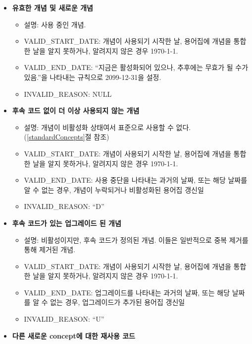 \documentclass[11pt]{book}
\providecommand{\tightlist}{%
  \setlength{\itemsep}{0pt}\setlength{\parskip}{0pt}}
\theoremstyle{definition}
\theoremstyle{definition}
\theoremstyle{definition}
\theoremstyle{remark}
\begin{document}
\begin{itemize}
\tightlist
\item
  \textbf{유효한 개념 및 새로운 개념}

  \begin{itemize}
  \tightlist
  \item
    설명: 사용 중인 개념.
  \item
    VALID\_START\_DATE: 개념이 사용되기 시작한 날, 용어집에 개념을
    통합한 날을 알지 못하거나, 알려지지 않은 경우 1970-1-1.
  \item
    VALID\_END\_DATE: ``지금은 활성화되어 있으나, 추후에는 무효가 될
    수가 있음.''을 나타내는 규칙으로 2099-12-31을 설정.
  \item
    INVALID\_REASON: NULL
  \end{itemize}
\item
  \textbf{후속 코드 없이 더 이상 사용되지 않는 개념}

  \begin{itemize}
  \tightlist
  \item
    설명: 개념이 비활성화 상태여서 표준으로 사용할 수 없다.
    (\ref{standardConcepts}절 참조)
  \item
    VALID\_START\_DATE: 개념이 사용되기 시작한 날, 용어집에 개념을
    통합한 날을 알지 못하거나, 알려지지 않은 경우 1970-1-1.
  \item
    VALID\_END\_DATE: 사용 중단을 나타내는 과거의 날짜, 또는 해당 날짜를
    알 수 없는 경우, 개념이 누락되거나 비활성화된 용어집 갱신일
  \item
    INVALID\_REASON: ``D''
  \end{itemize}
\item
  \textbf{후속 코드가 있는 업그레이드 된 개념}

  \begin{itemize}
  \tightlist
  \item
    설명: 비활성이지만, 후속 코드가 정의된 개념. 이들은 일반적으로 중복
    제거를 통해 제거된 개념.
  \item
    VALID\_START\_DATE: 개념이 사용되기 시작한 날, 용어집에 개념을
    통합한 날을 알지 못하거나, 알려지지 않은 경우 1970-1-1.
  \item
    VALID\_END\_DATE: 업그레이드를 나타내는 과거의 날짜, 또는 해당
    날짜를 알 수 없는 경우, 업그레이드가 추가된 용어집 갱신일
  \item
    INVALID\_REASON: ``U''
  \end{itemize}
\item
  \textbf{다른 새로운 concept에 대한 재사용 코드}


\end{itemize}
\end{document}
